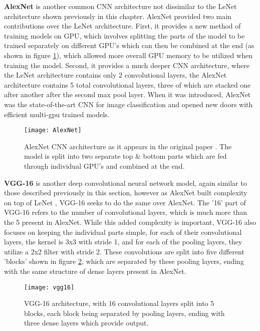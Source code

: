 \textbf{AlexNet} \cite{alexnet} is another common CNN architecture not dissimilar to the LeNet architecture \cite{lenet5} shown previously in this chapter. AlexNet provided two main contributions over the LeNet architecture. First, it provides a new method of training models on GPU, which involves splitting the parts of the model to be trained separately on different GPU's which can then be combined at the end (as shown in figure \ref{fig:alexnet}), which allowed more overall GPU memory to be utilized when training the model. Second, it provides a much deeper CNN architecture, where the LeNet architecture contains only 2 convolutional layers, the AlexNet architecture contains 5 total convolutional layers, three of which are stacked one after another after the second max pool layer. When it was introduced, AlexNet was the state-of-the-art CNN for image classification and opened new doors with efficient multi-gpu trained models.

\begin{figure}[ht]
	\texttt{[image: AlexNet]}
	\centering
	\caption{AlexNet \cite{alexnet} CNN architecture as it appears in the original paper \cite{alexnet}. The model is split into two separate top \& bottom parts which are fed through individual GPU's and combined at the end.}
	\label{fig:alexnet}
\end{figure}

\textbf{VGG-16} \cite{vgg16} is another deep convolutional neural network model, again similar to those described previously in this section, however as AlexNet \cite{alexnet} built complexity on top of LeNet \cite{lenet5}, VGG-16 seeks to do the same over AlexNet. The '16' part of VGG-16 refers to the number of convolutional layers, which is much more than the 5 present in AlexNet. While this added complexity is important, VGG-16 also focuses on keeping the individual parts simple, for each of their convolutional layers, the kernel is 3x3 with stride 1, and for each of the pooling layers, they utilize a 2x2 filter with stride 2. These convolutions are split into five different 'blocks' shown in figure \ref{fig:vgg16}, which are separated by these pooling layers, ending with the same structure of dense layers present in AlexNet.

\begin{figure}[ht]
	\texttt{[image: vgg16]}
	\centering
	\caption{VGG-16 \cite{vgg16} architecture, with 16 convolutional layers split into 5 blocks, each block being separated by pooling layers, ending with three dense layers which provide output.}
	\label{fig:vgg16}
\end{figure}

